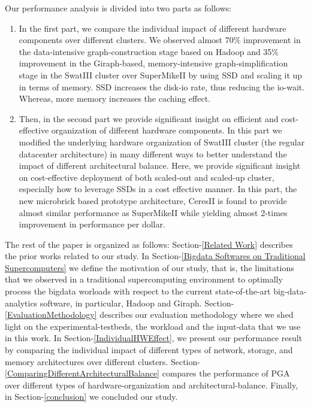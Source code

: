 \documentclass[conference]{IEEEtran}
\begin{document}
Our performance analysis is divided into two parts as follows: 
\begin{enumerate}
\item In the first part, we compare the individual impact of different hardware components over different clusters. We observed almost 70\% improvement in the data-intensive graph-construction stage based on Hadoop and 35\% improvement in the Giraph-based, memory-intensive graph-simplification stage in the SwatIII cluster over SuperMikeII by using SSD and scaling it up in terms of memory. SSD increases the disk-io rate, thus reducing the io-wait. Whereas, more memory increases the caching effect. 
\item Then, in the second part we provide significant insight on efficient and cost-effective organization of different hardware components. In this part we modified the underlying hardware organization of SwatIII cluster (the regular datacenter architecture) in many different ways to better understand the impact of different architectural balance. Here, we provide significant insight on cost-effective deployment of both scaled-out and scaled-up cluster, especially how to leverage SSDs in a cost effective manner. 
In this part, the new microbrick based prototype architecture, CeresII is found to provide almost similar performance as SuperMikeII while yielding almost 2-times improvement in performance per dollar. 
\end{enumerate}

The rest of the paper is organized as follows:
Section-\ref{Related Work} describes the prior works related to our study. 
In Section-\ref{Bigdata Softwares on Traditional Supercomputers} we define the motivation of our study, that is, the limitations that we observed in a traditional supercomputing environment to optimally process the bigdata worloads with respect to the current state-of-the-art big-data-analytics software, in particular, Hadoop and Giraph. 
Section-\ref{EvaluationMethodology} describes our evaluation methodology where we shed light on the experimental-testbeds, the workload and the input-data that we use in this work. 
In Section-\ref{IndividualHWEffect}, we present our performance result by comparing the individual impact of different types of network, storage, and memory architectures over different clusters. 
Section-\ref{ComparingDifferentArchitecturalBalance} compares the performance of PGA over different types of hardware-organization and architectural-balance. Finally, in Section-\ref{conclusion} we concluded our study. 
\end{document}
